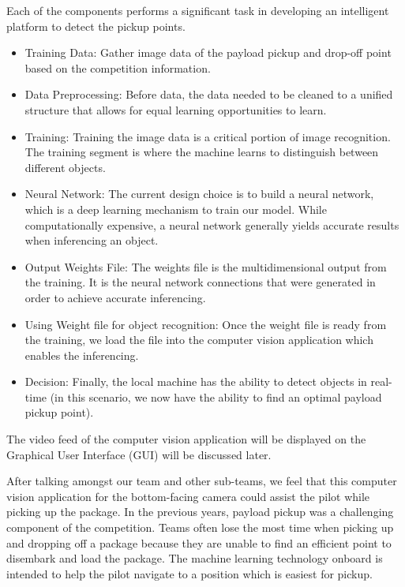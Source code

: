 \documentclass[onecolumn, oneside, letterpaper, draftclsnofoot, 10pt, compsoc]{IEEEtran}
\begin{document}
\noindent
Each of the components performs a significant task in developing an intelligent platform to detect the pickup points.
\begin{itemize}
    \item Training Data: Gather image data of the payload pickup and drop-off point based on the competition information.
    \item Data Preprocessing: Before data, the data needed to be cleaned to a unified structure that allows for equal learning opportunities to learn.
    \item Training: Training the image data is a critical portion of image recognition. The training segment is where the machine learns to distinguish between different objects.
    \item Neural Network: The current design choice is to build a neural network, which is a deep learning mechanism to train our model. While computationally expensive, a neural network generally yields accurate results when inferencing an object.
    \item Output Weights File: The weights file is the multidimensional output from the training. It is the neural network connections that were generated in order to achieve accurate inferencing.
    \item Using Weight file for object recognition: Once the weight file is ready from the training, we load the file into the computer vision application which enables the inferencing.
    \item Decision: Finally, the local machine has the ability to detect objects in real-time (in this scenario, we now have the ability to find an optimal payload pickup point).
\end{itemize}

\noindent
The video feed of the computer vision application will be displayed on the Graphical User Interface (GUI) will be discussed later.

\noindent
After talking amongst our team and other sub-teams, we feel that this computer vision application for the bottom-facing camera could assist the pilot while picking up the package. In the previous years, payload pickup was a challenging component of the competition. Teams often lose the most time when picking up and dropping off a package because they are unable to find an efficient point to disembark and load the package. The machine learning technology onboard is intended to help the pilot navigate to a position which is easiest for pickup.
\end{document}
